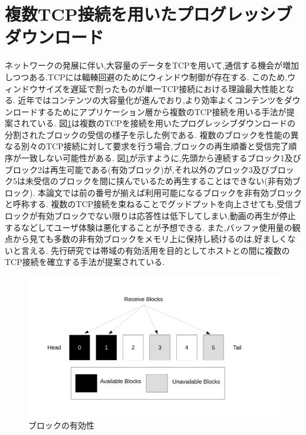 \documentclass[a4j,12pt]{gradthesis_utf8}
\begin{document}
\clearpage

\section{複数TCP接続を用いたプログレッシブダウンロード}
\label{hukusu}
ネットワークの発展に伴い,大容量のデータをTCPを用いて,通信する機会が増加しつつある.TCPには輻輳回避のためにウィンドウ制御が存在する.
このため,ウィンドウサイズを遅延で割ったものが単一TCP接続における理論最大性能となる.
近年ではコンテンツの大容量化が進んでおり,より効率よくコンテンツをダウンロードするためにアプリケーション層から複数のTCP接続を用いる手法が提案されている.
図\ref{block}は複数のTCPを接続を用いたプログレッシブダウンロードの分割されたブロックの受信の様子を示した例である.
複数のブロックを性能の異なる別々のTCP接続に対して要求を行う場合,ブロックの再生順番と受信完了順序が一致しない可能性がある.
図\ref{block}が示すように,先頭から連続するブロック1及びブロック2は再生可能である(有効ブロック)が,それ以外のブロック3及びブロック5は未受信のブロックを間に挟んでいるため再生することはできない(非有効ブロック).
本論文では前の番号が揃えば利用可能になるブロックを非有効ブロックと呼称する.
複数のTCP接続を束ねることでグッドプットを向上させても,受信ブロックが有効ブロックでない限りは応答性は低下してしまい,動画の再生が停止するなどしてユーザ体験は悪化することが予想できる.
また,バッファ使用量の観点から見ても多数の非有効ブロックをメモリ上に保持し続けるのは,好ましくないと言える.
先行研究では帯域の有効活用を目的としてホストとの間に複数のTCP接続を確立する手法が提案されている\cite{hiraoka}.

\begin{figure}[h]
	\centering
	\includegraphics[width=18.5cm]{figure/block.pdf}
	\caption{ブロックの有効性}
	\label{block}
\end{figure}

\clearpage
\end{document}
